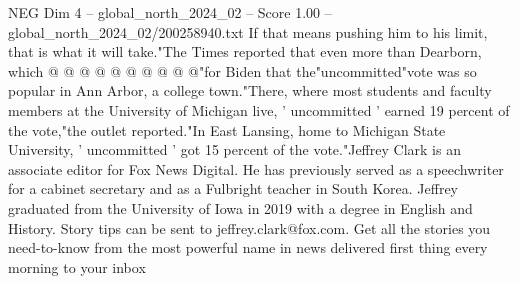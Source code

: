 \begin{textsample}{NEG Dim 4 – global\_north\_2024\_02 – Score 1.00 – global\_north\_2024\_02/200258940.txt}
If that means pushing him to his limit, that is what it will take."The Times reported that even more than Dearborn, which @ @ @ @ @ @ @ @ @ @"for Biden that the"uncommitted"vote was so popular in Ann Arbor, a college town."There, where most students and faculty members at the University of Michigan live, ' uncommitted ' earned 19 percent of the vote,"the outlet reported."In East Lansing, home to Michigan State University, ' uncommitted ' got 15 percent of the vote."Jeffrey Clark is an associate editor for Fox News Digital.
He has previously served as a speechwriter for a cabinet secretary and as a Fulbright teacher in South Korea.
Jeffrey graduated from the University of Iowa in 2019 with a degree in English and History.
Story tips can be sent to jeffrey.clark@fox.com.
Get all the stories you need-to-know from the most powerful name in news delivered first thing every morning to your inbox

\end{textsample}
